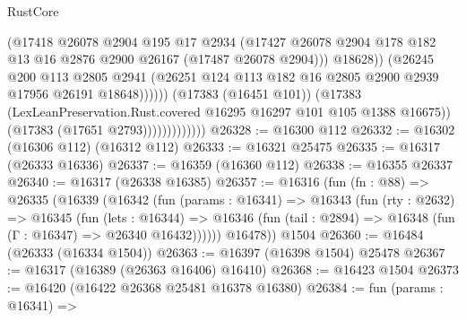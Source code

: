 \begin{lexlean}{RustCore}
\begin{coremodule}
                                      (@17418
                                        @26078
                                        @2904
                                        @195
                                        @17
                                        @2934
                                        (@17427
                                          @26078
                                          @2904
                                          @178
                                          @182
                                          @13
                                          @16
                                          @2876
                                          @2900
                                          @26167
                                          (@17487 @26078 @2904)))
                                      @18628))
                                  (@26245
                                    @200
                                    @113
                                    @2805
                                    @2941
                                    (@26251
                                      @124
                                      @113
                                      @182
                                      @16
                                      @2805
                                      @2900
                                      @2939
                                      @17956
                                      @26191
                                      @18648))))))
                          (@17383 (@16451 @101))
                          (@17383
                            (LexLeanPreservation.Rust.covered @16295 @16297 @101 @105 @1388 @16675))
                          (@17383 (@17651 @2793)))))))))))))
@26328 := @16300 @112
@26332 := @16302 (@16306 @112) (@16312 @112)
@26333 := @16321 @25475
@26335 := @16317 (@26333 @16336)
@26337 := @16359 (@16360 @112)
@26338 := @16355 @26337
@26340 := @16317 (@26338 @16385)
@26357 := @16316
    (fun (fn : @88) =>
    @26335
      (@16339
        (@16342
          (fun (params : @16341) =>
          @16343
            (fun (rty : @2632) =>
            @16345
              (fun (lets : @16344) =>
              @16346 (fun (tail : @2894) => @16348 (fun (Γ : @16347) => @26340 @16432))))))
        @16478))
    @1504
@26360 := @16484 (@26333 (@16334 @1504))
@26363 := @16397 (@16398 @1504) @25478
@26367 := @16317 (@16389 (@26363 @16406) @16410)
@26368 := @16423 @1504
@26373 := @16420 (@16422 @26368 @25481 @16378 @16380)
@26384 := fun (params : @16341) =>

\end{coremodule}
\end{lexlean}
